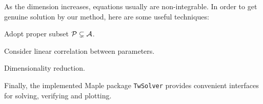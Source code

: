 As the dimension increases, equations usually are non-integrable. In order to get genuine solution by our method, here are some useful techniques:
\begin{compactitem}[\textbullet]
\item Adopt proper subset $\mathcal{P}\subsetneq  \mathcal{A}$. 
\item Consider linear correlation between parameters.
\item Dimensionality reduction.
\end{compactitem}

Finally, the implemented Maple package \texttt{TwSolver} provides convenient interfaces for solving, verifying and plotting.
